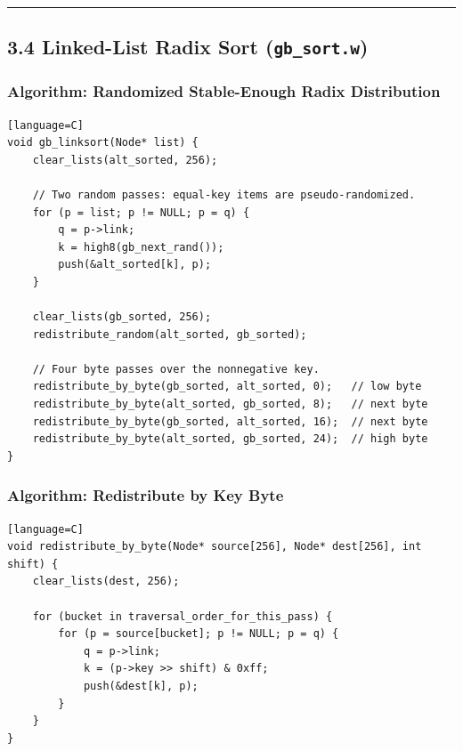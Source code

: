 \documentclass[11pt]{article}
\begin{document}
\begin{center}\rule{0.5\linewidth}{0.5pt}\end{center}

\subsection{\texorpdfstring{3.4 Linked-List Radix Sort (\texttt{gb\_sort.w})}{3.4 Linked-List Radix Sort (gb\_sort.w)}}\label{linked-list-radix-sort-gb_sort.w}

\subsubsection{Algorithm: Randomized Stable-Enough Radix Distribution}\label{algorithm-randomized-stable-enough-radix-distribution}

\begin{verbatim}[language=C]
void gb_linksort(Node* list) {
    clear_lists(alt_sorted, 256);

    // Two random passes: equal-key items are pseudo-randomized.
    for (p = list; p != NULL; p = q) {
        q = p->link;
        k = high8(gb_next_rand());
        push(&alt_sorted[k], p);
    }

    clear_lists(gb_sorted, 256);
    redistribute_random(alt_sorted, gb_sorted);

    // Four byte passes over the nonnegative key.
    redistribute_by_byte(gb_sorted, alt_sorted, 0);   // low byte
    redistribute_by_byte(alt_sorted, gb_sorted, 8);   // next byte
    redistribute_by_byte(gb_sorted, alt_sorted, 16);  // next byte
    redistribute_by_byte(alt_sorted, gb_sorted, 24);  // high byte
}
\end{verbatim}

\subsubsection{Algorithm: Redistribute by Key Byte}\label{algorithm-redistribute-by-key-byte}

\begin{verbatim}[language=C]
void redistribute_by_byte(Node* source[256], Node* dest[256], int shift) {
    clear_lists(dest, 256);

    for (bucket in traversal_order_for_this_pass) {
        for (p = source[bucket]; p != NULL; p = q) {
            q = p->link;
            k = (p->key >> shift) & 0xff;
            push(&dest[k], p);
        }
    }
}
\end{verbatim}
\end{document}
